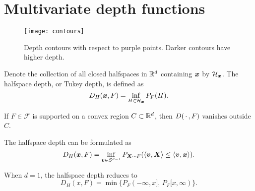 \section{Multivariate depth functions}

\begin{figure}
    \centering
    \texttt{[image: contours]}
    \caption{
        Depth contours with respect to purple points.
        Darker contours have higher depth.
    }
    \label{fig:depthcontours}
\end{figure}


\begin{definition}
    Denote the collection of all closed halfspaces in $\mathbb{R}^d$ containing $\bm{x}$
    by $\mathcal{H}_{\bm{x}}$.
    The halfspace depth, or Tukey depth, is defined as
    \begin{equation}
        D_H(\bm{x}, F) = \inf_{H \in \mathcal{H}_{\bm{x}}} P_{F}(H).
    \end{equation}
\end{definition}

\begin{remark}
    If $F \in \mathscr{F}$ is supported on a convex region $C \subset \mathbb{R}^d$,
    then $D(\,\cdot\,, F)$ vanishes outside $C$.
\end{remark}

\begin{proposition}
    The halfspace depth can be formulated as
    \begin{equation}
        D_H(\bm{x}, F) = \inf_{\bm{v} \in S^{d - 1}} P_{\bm{X} \sim F}(\langle \bm{v}, \bm{X} \rangle \leq \langle \bm{v}, \bm{x} \rangle).
    \end{equation}
\end{proposition}

\begin{remark}
    When $d = 1$, the halfspace depth reduces to
    \begin{equation}
        D_H(x, F) = \min\{P_F(-\infty, x],\, P_F[x, \infty)\}.
    \end{equation}
\end{remark}



